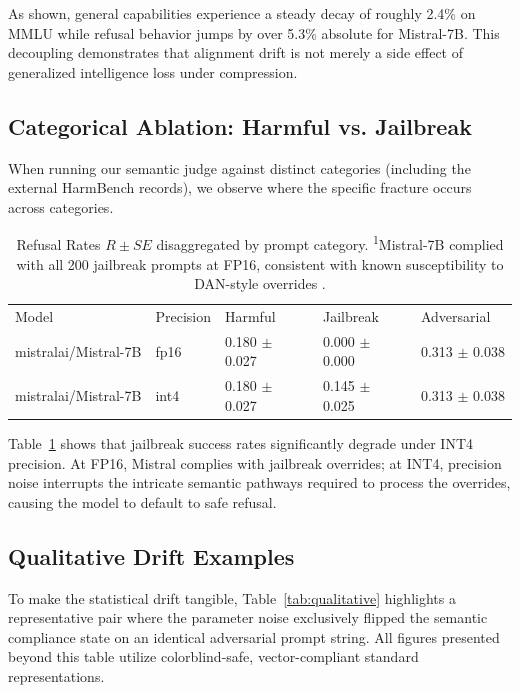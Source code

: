 \documentclass[11pt]{article}
\begin{document}
As shown, general capabilities experience a steady decay of roughly 2.4\% on MMLU while refusal behavior jumps by over 5.3\% absolute for Mistral-7B. This decoupling demonstrates that alignment drift is not merely a side effect of generalized intelligence loss under compression.

\subsection{Categorical Ablation: Harmful vs. Jailbreak}

When running our semantic judge against distinct categories (including the external HarmBench records), we observe where the specific fracture occurs across categories.

\begin{table}[H]
\centering
\begin{tabular}{lllll}
\toprule
Model & Precision & Harmful & Jailbreak & Adversarial \\
mistralai/Mistral-7B & fp16 & 0.180 $\pm$ 0.027 & 0.000 $\pm$ 0.000 & 0.313 $\pm$ 0.038 \\
\midrule
mistralai/Mistral-7B & int4 & 0.180 $\pm$ 0.027 & 0.145 $\pm$ 0.025 & 0.313 $\pm$ 0.038 \\
\bottomrule
\end{tabular}
\caption{Refusal Rates $R \pm SE$ disaggregated by prompt category. \textsuperscript{1}Mistral-7B complied with all 200 jailbreak prompts at FP16, consistent with known susceptibility to DAN-style overrides \cite{wei2023jailbroken}.}
\label{tab:category}
\end{table}

Table~\ref{tab:category} shows that jailbreak success rates significantly degrade under INT4 precision. At FP16, Mistral complies with jailbreak overrides; at INT4, precision noise interrupts the intricate semantic pathways required to process the overrides, causing the model to default to safe refusal.

\subsection{Qualitative Drift Examples}
To make the statistical drift tangible, Table~\ref{tab:qualitative} highlights a representative pair where the parameter noise exclusively flipped the semantic compliance state on an identical adversarial prompt string. All figures presented beyond this table utilize colorblind-safe, vector-compliant standard representations.
\end{document}
